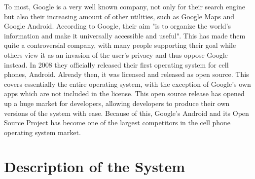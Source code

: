 \documentclass[conference]{IEEEtran}
\begin{document}

To most, Google\cite{android} is a very well known company, not only for their search engine but also their increasing amount of other utilities, such as Google Maps and Google Android. According to Google, their aim "is to organize the world’s information and make it universally accessible and useful".\cite{Goggin} This has made them quite a controversial company, with many people supporting their goal while others view it as an invasion of the user's privacy and thus oppose Google instead. 
In 2008 they officially released their first operating system for cell phones, Android.\cite{android-release} Already then, it was licensed and released as open source.\cite{android} This covers essentially the entire operating system, with the exception of Google's own apps which are not included in the license. This open source release has opened up a huge market for developers, allowing developers to produce their own versions of the system with ease. Because of this, Google's Android and its Open Source Project has become one of the largest competitors in the cell phone operating system market.\cite{android-market}

\section{Description of the System}
\label{system}
\end{document}
